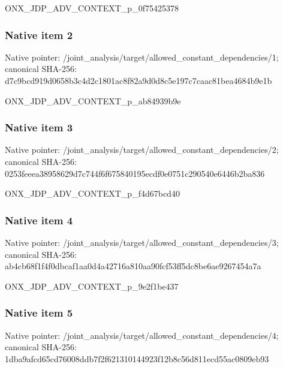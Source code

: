 \documentclass[10pt,a4paper]{article}
\begin{document}
\begingroup\raggedright\sloppy ONX\_\allowbreak{}JDP\_\allowbreak{}ADV\_\allowbreak{}CONTEXT\_\allowbreak{}p\_\allowbreak{}0f75425378\par\endgroup

\subsubsection{Native item 2}
Native pointer: /joint\_\allowbreak{}analysis/target/allowed\_\allowbreak{}constant\_\allowbreak{}dependencies/1; canonical SHA-256: d7c9bcd919d0658b3c4d2c1801ac8f82a9d0d8c5e197c7caac81bea4684b9e1b

\begingroup\raggedright\sloppy ONX\_\allowbreak{}JDP\_\allowbreak{}ADV\_\allowbreak{}CONTEXT\_\allowbreak{}p\_\allowbreak{}ab84939b9e\par\endgroup

\subsubsection{Native item 3}
Native pointer: /joint\_\allowbreak{}analysis/target/allowed\_\allowbreak{}constant\_\allowbreak{}dependencies/2; canonical SHA-256: 0253feeea38958629d7c744f6f675840195ecdf0e0751c290540e6446b2ba836

\begingroup\raggedright\sloppy ONX\_\allowbreak{}JDP\_\allowbreak{}ADV\_\allowbreak{}CONTEXT\_\allowbreak{}p\_\allowbreak{}f4d67bcd40\par\endgroup

\subsubsection{Native item 4}
Native pointer: /joint\_\allowbreak{}analysis/target/allowed\_\allowbreak{}constant\_\allowbreak{}dependencies/3; canonical SHA-256: ab4cb68f1f4f0dbcaf1aa0d4a42716a810aa90fcf53ff5dc8be6ae9267454a7a

\begingroup\raggedright\sloppy ONX\_\allowbreak{}JDP\_\allowbreak{}ADV\_\allowbreak{}CONTEXT\_\allowbreak{}p\_\allowbreak{}9e2f1be437\par\endgroup

\subsubsection{Native item 5}
Native pointer: /joint\_\allowbreak{}analysis/target/allowed\_\allowbreak{}constant\_\allowbreak{}dependencies/4; canonical SHA-256: 1dba9afcd65cd76008ddb7f2f621310144923f12b8c56d811ecd55ac0809eb93
\end{document}
